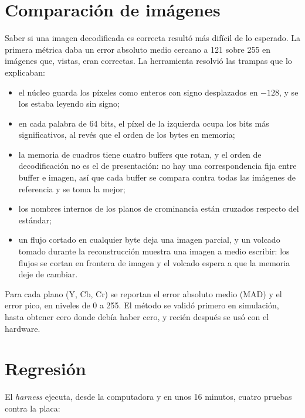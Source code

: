 \section{Comparación de imágenes}
\label{sec:framecmp}

Saber si una imagen decodificada es correcta resultó más difícil de lo
esperado. La primera métrica daba un error absoluto medio cercano a 121 sobre
255 en imágenes que, vistas, eran correctas. La herramienta 
resolvió las trampas que lo explicaban:

\begin{itemize}
  \item el núcleo guarda los píxeles como enteros con signo desplazados en
    $-128$, y se los estaba leyendo sin signo;
  \item en cada palabra de 64 bits, el píxel de la izquierda ocupa los bits
    más significativos, al revés que el orden de los bytes en memoria;
  \item la memoria de cuadros tiene cuatro buffers que rotan, y el orden de
    decodificación no es el de presentación: no hay una correspondencia fija
    entre buffer e imagen, así que cada buffer se compara contra todas las
    imágenes de referencia y se toma la mejor;
  \item los nombres internos de los planos de crominancia están cruzados
    respecto del estándar;
  \item un flujo cortado en cualquier byte deja una imagen parcial, y un
    volcado tomado durante la reconstrucción muestra una imagen a medio
    escribir: los flujos se cortan en frontera de imagen y el volcado espera
    a que la memoria deje de cambiar.
\end{itemize}

Para cada plano (Y, Cb, Cr) se reportan el error absoluto medio (MAD) y el
error pico, en niveles de 0 a 255. El método se validó primero en
simulación, hasta obtener cero donde debía haber cero, y recién después se
usó con el hardware.

\section{Regresión}
\label{sec:regresion}

El \emph{harness}  ejecuta, desde la computadora y en unos 16
minutos, cuatro pruebas contra la placa:

